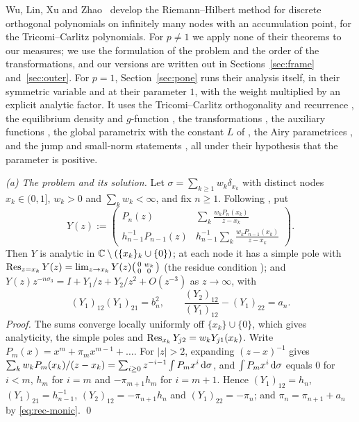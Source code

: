 Wu, Lin, Xu and Zhao~\cite{WLXZ} develop the Riemann--Hilbert method for discrete orthogonal polynomials on infinitely
many nodes with an accumulation point, for the Tricomi--Carlitz polynomials. For $p\ne1$ we apply none of their
theorems to our measures; we use the formulation of the problem and the order of the transformations, and our versions
are written out in Sections~\ref{sec:frame} and~\ref{sec:outer}. For $p=1$, Section~\ref{sec:pone} runs their analysis
itself, in their symmetric variable and at their parameter $1$, with the weight multiplied by an explicit analytic
factor. It uses the Tricomi--Carlitz orthogonality and recurrence \cite[(1.4)--(1.9)]{WLXZ}, the equilibrium density and
$g$-function \cite[(2.1)--(2.4), (4.3)]{WLXZ}, the transformations \cite[(2.14)--(2.15), (3.1), (3.4), (3.6)--(3.12),
(3.15), (4.1), (4.12)]{WLXZ}, the auxiliary functions \cite[(4.14)--(4.20), (4.22), (4.24), (4.28)]{WLXZ}, the global parametrix
\cite[(5.11)]{WLXZ} with the constant $L$ of \cite[(5.9)]{WLXZ}, the Airy parametrices \cite[(6.8),
(6.10)--(6.21)]{WLXZ}, and the jump and small-norm statements \cite[(5.8), (6.34)--(6.37)]{WLXZ}, all under their
hypothesis that the parameter is positive.

\emph{(a) The problem and its solution.} Let $\sigma=\sum_{k\ge1}w_k\delta_{x_k}$ with distinct nodes
$x_k\in(0,1]$, $w_k>0$ and $\sum_kw_k<\infty$, and fix $n\ge1$. Following \cite[(2.14) and Theorem~2.3]{WLXZ}, put
\begin{equation}\label{eq:Y-solution}
  Y(z):=\begin{pmatrix}P_n(z) & \displaystyle\sum_k\frac{w_kP_n(x_k)}{z-x_k}\\[3mm]
  h_{n-1}^{-1}P_{n-1}(z) & \displaystyle h_{n-1}^{-1}\sum_k\frac{w_kP_{n-1}(x_k)}{z-x_k}\end{pmatrix}.
\end{equation}
Then $Y$ is analytic in $\mathbb{C}\setminus(\{x_k\}_k\cup\{0\})$; at each node it has a simple pole with
$\operatorname*{Res}_{z=x_k}Y(z)=\lim_{z\to x_k}Y(z)\bigl(\begin{smallmatrix}0&w_k\\0&0\end{smallmatrix}\bigr)$ (the residue
condition \cite[(2.14)]{WLXZ}); and $Y(z)z^{-n\sigma_3}=I+Y_1/z+Y_2/z^2+O(z^{-3})$ as $z\to\infty$, with
\begin{equation}\label{eq:Y-extract}
  (Y_1)_{12}(Y_1)_{21}=b_n^2,\qquad \frac{(Y_2)_{12}}{(Y_1)_{12}}-(Y_1)_{22}=a_n .
\end{equation}
\emph{Proof.} The sums converge locally uniformly off $\{x_k\}\cup\{0\}$, which gives analyticity, the simple poles and
$\operatorname*{Res}_{x_k}Y_{j2}=w_kY_{j1}(x_k)$. Write $P_m(x)=x^m+\pi_mx^{m-1}+\dots$. For $|z|>2$, expanding $(z-x)^{-1}$ gives
$\sum_kw_kP_m(x_k)/(z-x_k)=\sum_{i\ge0}z^{-i-1}\int P_mx^i\,\mathrm{d}\sigma$, and $\int P_mx^i\,\mathrm{d}\sigma$ equals $0$ for $i<m$,
$h_m$ for $i=m$ and $-\pi_{m+1}h_m$ for $i=m+1$. Hence $(Y_1)_{12}=h_n$, $(Y_1)_{21}=h_{n-1}^{-1}$,
$(Y_2)_{12}=-\pi_{n+1}h_n$ and $(Y_1)_{22}=-\pi_n$; and $\pi_n=\pi_{n+1}+a_n$ by \eqref{eq:rec-monic}. \qed

